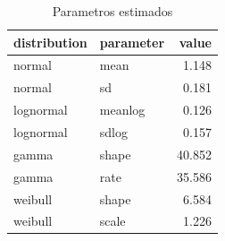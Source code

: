 \begin{table}

\caption{\label{tab:parametros_dist_g20}Parametros estimados}
\centering
\begin{tabular}[t]{llr}
\toprule
distribution & parameter & value\\
\midrule
normal & mean & 1.148\\
normal & sd & 0.181\\
lognormal & meanlog & 0.126\\
lognormal & sdlog & 0.157\\
gamma & shape & 40.852\\
\addlinespace
gamma & rate & 35.586\\
weibull & shape & 6.584\\
weibull & scale & 1.226\\
\bottomrule
\end{tabular}
\end{table}
